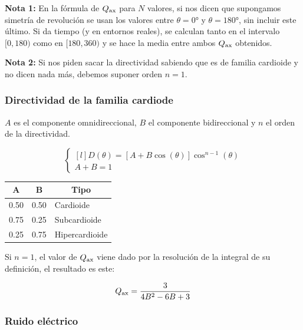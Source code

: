 \documentclass[a4paper, 8pt]{extarticle}
\begin{document}
\begin{multicols}{3}
  \textbf{Nota 1:} En la fórmula de $Q_{\textnormal{ax}}$ para $N$ valores, si nos dicen que supongamos simetría de revolución se usan los valores entre $\theta = \ang{0}$ y $\theta = \ang{180}$, sin incluir este último. Si da tiempo (y en entornos reales), se calculan tanto en el intervalo $[0, 180)$ como en $[180, 360)$ y se hace la media entre ambos $Q_{\textnormal{ax}}$ obtenidos.

  \textbf{Nota 2:} Si nos piden sacar la directividad sabiendo que es de familia cardioide y no dicen nada más, debemos suponer orden $n=1$.
  \subsubsection{Directividad de la familia cardiode}
  $A$ es el componente omnidireccional, $B$ el componente bidireccional y $n$ el orden de la directividad.

  \[\left\lbrace
    \begin{matrix*}[l]
      D (\theta ) = \left[ A + B \cos (\theta ) \right] \cos ^{n-1} (\theta )  \\
      A + B = 1
    \end{matrix*}\right.\]


  \begin{center}
    \begin{tabular}{|c|c|l|}
      \hline
      \rowcolor[rgb]{ .663,  .816,  .557} A    & B    & \multicolumn{1}{c|}{Tipo} \\
      \hline
      \rowcolor[rgb]{ .886,  .937,  .855} 0.50 & 0.50 & Cardioide                 \\
      \hline
      \rowcolor[rgb]{ .886,  .937,  .855} 0.75 & 0.25 & Subcardioide              \\
      \hline
      \rowcolor[rgb]{ .886,  .937,  .855} 0.25 & 0.75 & Hipercardioide            \\
      \hline
    \end{tabular}
  \end{center}

  Si $n = 1$, el valor de $Q _{\textnormal{ax}}$ viene dado por la resolución de la integral de su definición, el resultado es este:

  \[ Q _{\textnormal{ax}} = \frac{3}{4B^2 - 6B + 3} \]

  \color{red}\xspace
  \subsubsection{Ruido eléctrico}


\end{multicols}
\end{document}
